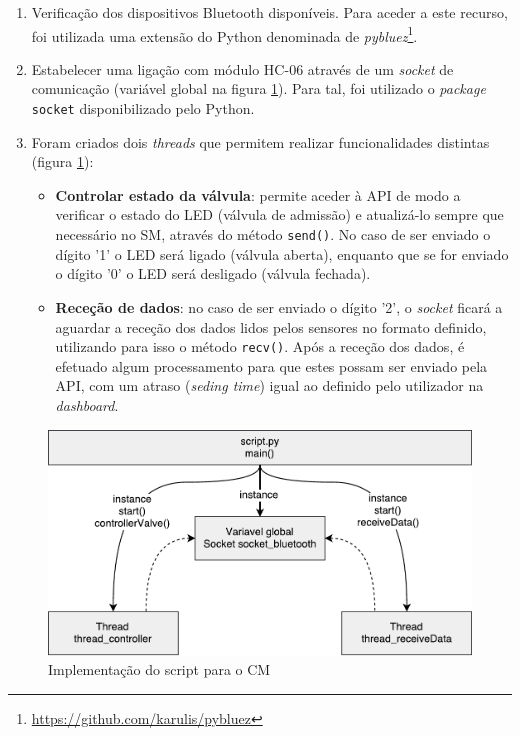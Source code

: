 \begin{enumerate}
	\item Verificação dos dispositivos Bluetooth disponíveis. Para aceder a este recurso, foi utilizada uma extensão do Python denominada de \textit{pybluez}\footnote{\url{https://github.com/karulis/pybluez}}. 
	
	
	\item Estabelecer uma ligação com módulo HC-06 através de um \textit{socket} de comunicação (variável global na figura \ref{threadscript}). Para tal, foi utilizado o \textit{package} \texttt{socket} disponibilizado pelo Python.
	
	\item Foram criados dois \textit{threads} que permitem realizar funcionalidades distintas (figura \ref{threadscript}): 
	
	\begin{itemize}
		\item \textbf{Controlar estado da válvula}: permite aceder à \ac{API} de modo a verificar o estado do \ac{LED}  (válvula de admissão) e atualizá-lo sempre que necessário no \acl{SM}, através do método \texttt{send()}. No caso de ser enviado o dígito '1' o \ac{LED} será ligado (válvula aberta), enquanto que se for enviado o dígito '0' o  \ac{LED} será desligado (válvula fechada). 
		
		\item \textbf{Receção de dados}: no caso de ser enviado o  dígito '2', o \textit{socket} ficará a aguardar a receção dos dados lidos pelos sensores no formato definido, utilizando para isso o método \texttt{recv()}. Após a receção dos dados, é efetuado algum processamento para que estes possam ser enviado pela \ac{API}, com um atraso (\textit{seding time}) igual ao definido pelo utilizador na \textit{dashboard}. 
		
		
	\end{itemize}
	
	

\end{enumerate}





\begin{figure}[h]
	\centering
	\includegraphics[width=0.67\linewidth]{esquemas/threads-python-script.pdf}
	\caption{Implementação do script para o \ac{CM} }
	\label{threadscript}
\end{figure}










